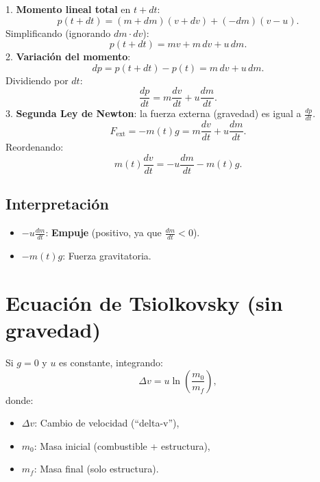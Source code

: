 \documentclass{article}
\begin{document}
1. \textbf{Momento lineal total} en $t + dt$:
   \[
   p(t + dt) = (m + dm)(v + dv) + (-dm)(v - u).
   \] 
Simplificando (ignorando $dm \cdot dv$):
   \[
   p(t + dt) = mv + m \, dv + u \, dm.
   \]
2. \textbf{Variación del momento}:
   \[
   dp = p(t + dt) - p(t) = m \, dv + u \, dm.
   \]
   Dividiendo por $dt$:
   \[
   \frac{dp}{dt} = m \frac{dv}{dt} + u \frac{dm}{dt}.
   \]
3. \textbf{Segunda Ley de Newton}: la fuerza externa (gravedad) es igual a $\frac{dp}{dt}$.
   \[
   F_{\text{ext}} = -m(t) g = m \frac{dv}{dt} + u \frac{dm}{dt}.
   \]
   Reordenando:
   \[
   m(t) \frac{dv}{dt} = -u \frac{dm}{dt} - m(t) g.
   \]

\subsection{Interpretación}
\begin{itemize}
    \item $-u \frac{dm}{dt}$: \textbf{Empuje} (positivo, ya que $\frac{dm}{dt} < 0$).
    \item $-m(t)g$: Fuerza gravitatoria.
\end{itemize}

\section{Ecuación de Tsiolkovsky (sin gravedad)}
Si $g = 0$ y $u$ es constante, integrando:
\[
\Delta v = u \ln \left( \frac{m_0}{m_f} \right),
\]
donde:
\begin{itemize}
    \item $\Delta v$: Cambio de velocidad (``delta-v''),
    \item $m_0$: Masa inicial (combustible + estructura),
    \item $m_f$: Masa final (solo estructura).
\end{itemize}

\end{document}
